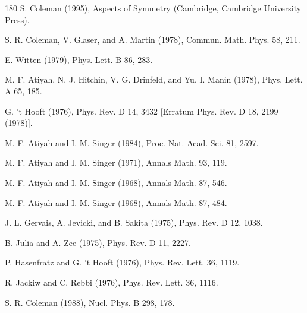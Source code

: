 \begin{thebibliography}{180}
 S. Coleman (1995), Aspects of Symmetry (Cambridge, Cambridge University Press).

 S. R. Coleman, V. Glaser, and A. Martin (1978), Commun. Math. Phys. 58, 211.

 E. Witten (1979), Phys. Lett. B 86, 283.

 M. F. Atiyah, N. J. Hitchin, V. G. Drinfeld, and Yu. I. Manin (1978), Phys. Lett. A 65, 185.

 G. 't Hooft (1976), Phys. Rev. D 14, 3432 [Erratum Phys. Rev. D 18, 2199 (1978)].

 M. F. Atiyah and I. M. Singer (1984), Proc. Nat. Acad. Sci. 81, 2597.

 M. F. Atiyah and I. M. Singer (1971), Annals Math. 93, 119.

 M. F. Atiyah and I. M. Singer (1968), Annals Math. 87, 546.

 M. F. Atiyah and I. M. Singer (1968), Annals Math. 87, 484.

 J. L. Gervais, A. Jevicki, and B. Sakita (1975), Phys. Rev. D 12, 1038.

 B. Julia and A. Zee (1975), Phys. Rev. D 11, 2227.

 P. Hasenfratz and G. 't Hooft (1976), Phys. Rev. Lett. 36, 1119.

 R. Jackiw and C. Rebbi (1976), Phys. Rev. Lett. 36, 1116.

 S. R. Coleman (1988), Nucl. Phys. B 298, 178.


\end{thebibliography}
